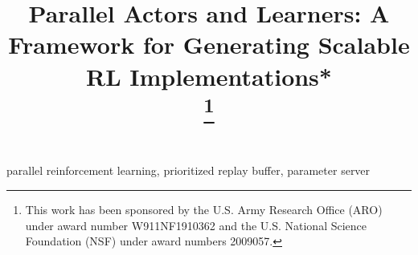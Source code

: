 \documentclass[conference]{IEEEtran}
\begin{document}

\title{Parallel Actors and Learners: A Framework for Generating Scalable RL Implementations*\\
\thanks{This work has been sponsored by the U.S. Army Research Office (ARO) under award number W911NF1910362 and the U.S. National Science Foundation (NSF) under award numbers 2009057.}
}

\author{
\and
{}
}

\maketitle



\begin{IEEEkeywords}
parallel reinforcement learning, prioritized replay buffer, parameter server
\end{IEEEkeywords}

















\end{document}
